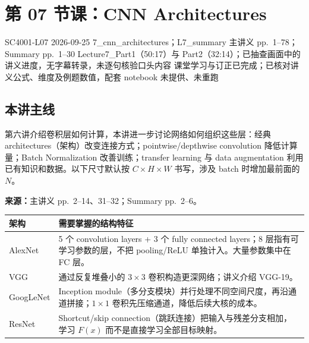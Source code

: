 
\section{第 07 节课：CNN Architectures}
\label{lecture:SC4001-L07}

\lecturemeta
  {SC4001-L07}
  {2026-09-25}
  {7\_cnn\_architectures；L7\_summary}
  {主讲义 pp.~1--78；Summary pp.~1--30}
  {Lecture7\_Part1（50:17）与 Part2（32:14）；已抽查画面中的讲义进度，无字幕转录，未逐句核验口头内容}
  {课堂学习与订正已完成；已核对讲义公式、维度及例题数值，配套 notebook 未提供、未重跑}

\subsection{本讲主线}

第六讲介绍卷积层如何计算，本讲进一步讨论网络如何组织这些层：经典 architectures（架构）改变连接方式；pointwise/depthwise convolution 降低计算量；Batch Normalization 改善训练；transfer learning 与 data augmentation 利用已有知识和数据。以下尺寸默认按 $C\times H\times W$ 书写，涉及 batch 时增加最前面的 $N$。


\textbf{来源：}主讲义 pp.~2--14、31--32；Summary pp.~2--6。

\begin{center}
\small
\begin{tabularx}{\textwidth}{@{}lX@{}}
\toprule
架构 & 需要掌握的结构特征 \\
\midrule
AlexNet & 5 个 convolution layers + 3 个 fully connected layers；8 层指有可学习参数的层，不把 pooling/ReLU 单独计入。大量参数集中在 FC 层。 \\
VGG & 通过反复堆叠小的 $3\times3$ 卷积构造更深网络；讲义介绍 VGG-19。 \\
GoogLeNet & Inception module（多分支模块）并行处理不同空间尺度，再沿通道拼接；$1\times1$ 卷积先压缩通道，降低后续大核的成本。 \\
ResNet & Shortcut/skip connection（跳跃连接）把输入与残差分支相加，学习 $F(x)$ 而不是直接学习全部目标映射。 \\
\bottomrule
\end{tabularx}
\end{center}

